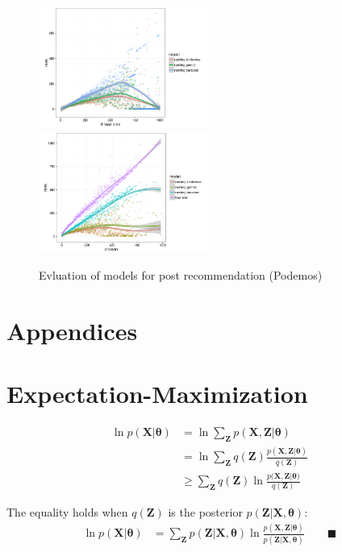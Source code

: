 \documentclass[smallextended]{svjour3}          %
\begin{document}
\begin{figure}
\center
\includegraphics[width=0.5\textwidth]{benchmark_ranking_by_threadsize}%
\includegraphics[width=0.5\textwidth]{benchmark_ranking_by_chosen}
\caption{Evluation of models for post recommendation (Podemos)}
\end{figure}


\newpage
\appendix
\section*{Appendices}
\section{Expectation-Maximization}

\begin{align}
\ln p(\mathbf{X} | \boldsymbol{\theta}) &=  \ln \sum_{\mathbf{Z}}  p(\mathbf{X}, \mathbf{Z}  | \boldsymbol{\theta}) \\
&=\ln \sum_{\mathbf{Z}} q(\mathbf{Z}) \frac{p(\mathbf{X}, \mathbf{Z}  | \boldsymbol{\theta})}{ q(\mathbf{Z})}\\
&\geq \sum_{\mathbf{Z}} q(\mathbf{Z}) \ln \frac{p(\mathbf{X}, \mathbf{Z} | \boldsymbol{\theta)}}{q(\mathbf{Z})}
\end{align}


The equality holds when $q(\mathbf{Z})$ is the posterior $p(\mathbf{Z} | \mathbf{X}, \boldsymbol{\theta})$:
\begin{align}
\ln p(\mathbf{X} | \boldsymbol{\theta}) &=  \sum_{\mathbf{Z}} p(\mathbf{Z} | \mathbf{X}, \boldsymbol{\theta}) \ln \frac{p(\mathbf{X, Z} | \boldsymbol{\theta})}{ p(\mathbf{Z} | \mathbf{X}, \boldsymbol{\theta})} \qquad \blacksquare
\label{eq:em_general}
\end{align}
 

\end{document}
